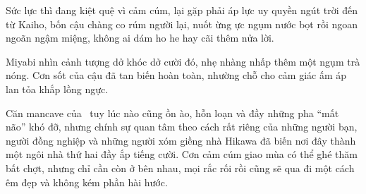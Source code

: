 \documentclass[../main.tex]{subfiles}
\begin{document}
Sức lực thì đang kiệt quệ vì cảm cúm, lại gặp phải áp lực uy quyền ngút trời đến từ Kaiho, bốn cậu chàng co rúm người lại, nuốt ừng ực ngụm nước bọt rồi ngoan ngoãn ngậm miệng, không ai dám ho he hay cãi thêm nửa lời.

Miyabi nhìn cảnh tượng dở khóc dở cười đó, nhẹ nhàng nhấp thêm một ngụm trà nóng. Cơn sốt của cậu đã tan biến hoàn toàn, nhường chỗ cho cảm giác ấm áp lan tỏa khắp lồng ngực.

Căn mancave của \hls\ tuy lúc nào cũng ồn ào, hỗn loạn và đầy những pha ``mất não'' khó đỡ, nhưng chính sự quan tâm theo cách rất riêng của những người bạn, người đồng nghiệp và những người xóm giềng nhà Hikawa đã biến nơi đây thành một ngôi nhà thứ hai đầy ắp tiếng cười. Cơn cảm cúm giao mùa có thể ghé thăm bất chợt, nhưng chỉ cần còn ở bên nhau, mọi rắc rối rồi cũng sẽ qua đi một cách êm đẹp và không kém phần hài hước.
\end{document}
